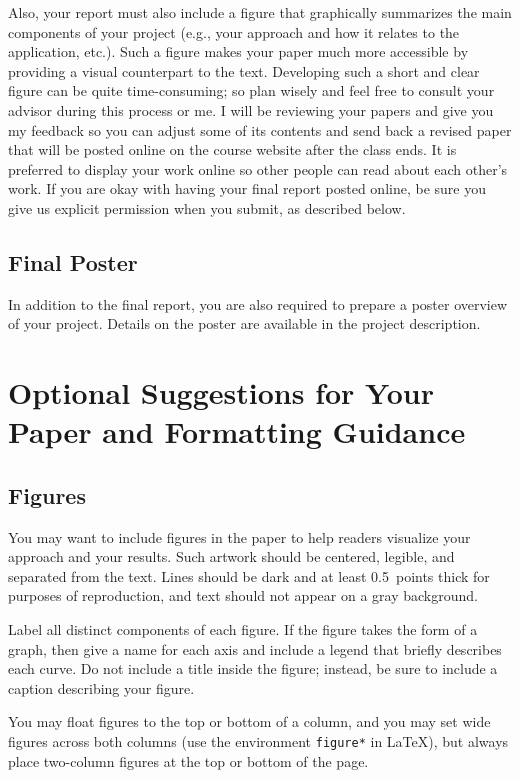 \documentclass{article}
\begin{document}
Also, your report must also include a figure that graphically summarizes the main components of your project (e.g., your approach and how it relates to the application, etc.). Such a figure makes your paper much more accessible by providing a visual counterpart to the text. Developing such a short and clear figure can be quite time-consuming; so plan wisely and feel free to consult your advisor during this process or me. I will be reviewing your papers and give you my feedback so you can adjust some of its contents and send back a revised paper that will be posted online on the course website after the class ends. It is preferred to display your work online so other people can read about each other's work. If you are okay with having your final report posted online, be sure you give us explicit permission when you submit, as described below.

\subsection{Final Poster}

In addition to the final report, you are also required to prepare a poster overview of your project. Details on the poster are available in the project description.

\section{Optional Suggestions for Your Paper and Formatting Guidance} 

\subsection{Figures}
 
You may want to include figures in the paper to help readers visualize
your approach and your results. Such artwork should be centered,
legible, and separated from the text. Lines should be dark and at
least 0.5~points thick for purposes of reproduction, and text should
not appear on a gray background.

Label all distinct components of each figure. If the figure takes the
form of a graph, then give a name for each axis and include a legend
that briefly describes each curve. Do not include a title inside the
figure; instead, be sure to include a caption describing your figure.

You may float figures to the top or
bottom of a column, and you may set wide figures across both columns
(use the environment {\tt figure*} in \LaTeX), but always place
two-column figures at the top or bottom of the page.
\end{document}
